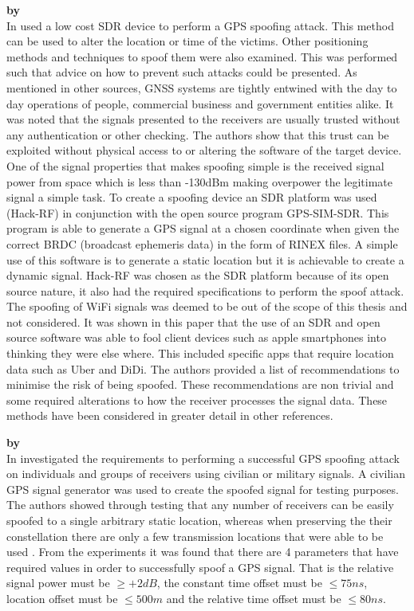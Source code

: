 \textbf{\emph{} by \citeauthor{RN28}} \\
In \citeyear{RN28} \citeauthor{RN28} \cite{RN28} used a low cost SDR device to perform a GPS spoofing attack. This method can be used to alter the location or time
of the victims. Other positioning methods and techniques to spoof them were also examined. This was performed such that advice on how to prevent such attacks could be 
presented. As mentioned in other sources, GNSS systems are tightly entwined with the day to day operations of people, commercial business and government entities alike.
It was noted that the signals presented to the receivers are usually trusted without any authentication or other checking. The authors show that this trust can be exploited
without physical access to or altering the software of the target device. One of the signal properties that makes spoofing simple is the received signal power from space
which is less than -130dBm making overpower the legitimate signal a simple task. 
To create a spoofing device an SDR platform was used (Hack-RF) in conjunction with the open source program GPS-SIM-SDR. This program is able to generate a GPS signal
at a chosen coordinate when given the correct BRDC (broadcast ephemeris data) in the form of RINEX files. A simple use of this software is to generate a static location
but it is achievable to create a dynamic signal. Hack-RF was chosen as the SDR platform because of its open source nature, it also had the required specifications to
perform the spoof attack. The spoofing of WiFi signals was deemed to be out of the scope of this thesis and not considered.
It was shown in this paper that the use of an SDR and open source software was able to fool client devices such as apple smartphones into thinking they were else where.
This included specific apps that require location data such as Uber and DiDi. The authors provided a list of recommendations to minimise the risk of being spoofed. 
These recommendations are non trivial and some required alterations to how the receiver processes the signal data. These methods have been considered in greater
detail in other references.

\medskip

\textbf{\emph{} by \citeauthor{RN30}} \\
In \citeyear{RN30} \citeauthor{RN30} \cite{RN30} investigated the requirements to performing a successful GPS spoofing attack on individuals and groups of receivers
using civilian or military signals. A civilian GPS signal generator was used to create the spoofed signal for testing purposes.
The authors showed through testing that any number of receivers can be easily spoofed to a single arbitrary static location, whereas
when preserving the their constellation there are only a few transmission locations that were able to be used .
From the experiments it was found that there are 4 parameters that have required values in order to successfully spoof a GPS signal. That is the relative signal 
power must be $\geq+2dB$, the constant time offset must be $\leq 75ns$, location offset must be $\leq 500m$ and the relative time offset must be $\leq 80ns$.


